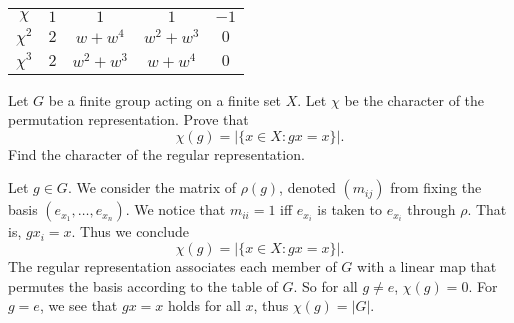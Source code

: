 \begin{questions}
\begin{parts}
\begin{solution}
\begin{center}
\begin{tabular}{ccccc}
          $\chi$        & $1$     & $1$          & $1$            & $-1$                          \\
          $\chi^2$      & $2$     & $w + w^4$    & $w^2 + w^3$    & $0$                           \\
          $\chi^3$      & $2$     & $w^2 + w^3$  & $w + w^4$      & $0$                           \\
          \bottomrule
        \end{tabular}
      \end{center}
    \end{solution}
  \end{parts}

  \question
  Let $G$ be a finite group acting on a finite set $X$. Let $\chi$ be the character of the permutation representation. Prove that
  \[ \chi(g) = \lvert \{x \in X: gx = x \}\rvert. \] 
  Find the character of the regular representation. 
  \begin{solution}
    Let $g \in G$. We consider the matrix of $\rho(g)$, denoted $(m_{ij})$ from fixing the basis $(e_{x_1}, \ldots, e_{x_n})$. We notice that $m_{ii} = 1$ iff $e_{x_i}$ is taken to $e_{x_i}$ through $\rho$. That is, $gx_i = x$. Thus we conclude  
  \[ \chi(g) = \lvert \{x \in X: gx = x \}\rvert. \] 
    The regular representation associates each member of $G$ with a linear map that permutes the basis according to the table of $G$. So for all $g \neq e$, $\chi(g) = 0$. For $g = e$, we see that $gx = x$ holds for all $x$, thus $\chi(g) = \lvert G \rvert$.
  \end{solution}
\end{questions}


